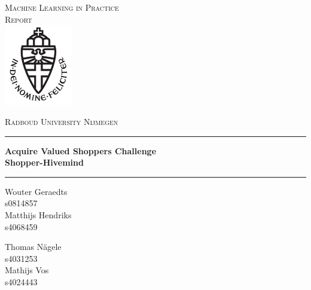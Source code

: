 \documentclass[a4paper]{article}
\begin{document}
\begin{titlepage}
	\begin{center}
	\textsc{\LARGE Machine Learning in Practice\\}
	\textsc{\Large Report}\\[1.5cm]
	\includegraphics[height=100pt]{logo}
   
	\vspace{0.4cm}
	\textsc{\Large Radboud University Nijmegen}\\[.5cm]
	\hrule
	\vspace{0.4cm}
	\textbf{\huge Acquire Valued Shoppers Challenge}\\[0.4cm]
	\textbf{\huge Shopper-Hivemind}\\[0.4cm]
	\hrule
	\vspace{1cm}
	\begin{minipage}[t]{0.45\textwidth}
	\begin{flushleft} \large
	Wouter Geraedts\\
	s0814857\\[0.7cm]
	Matthijs Hendriks\\
	s4068459\\[0.7cm]
	\end{flushleft}
	\end{minipage}
	\begin{minipage}[t]{0.45\textwidth}
	\begin{flushright} \large
	Thomas N\"agele\\
	s4031253\\[0.7cm]
	Mathijs Vos\\
	s4024443\\[0.7cm]
	\end{flushright}
	\end{minipage}
	\vspace{.7cm}
	

\end{center}
\end{titlepage}
\end{document}
